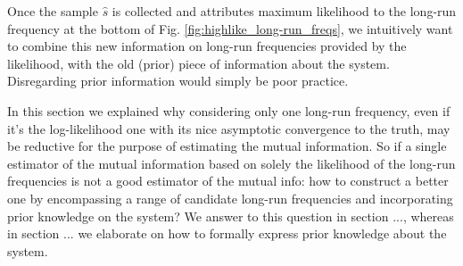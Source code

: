 Once the sample $\hat{s}$ is collected  and attributes maximum likelihood to the long-run frequency at the bottom of Fig. \ref{fig:highlike_long-run_freqs}, we intuitively want to combine this new information on long-run frequencies provided by the likelihood, with the old (prior) piece of information about the system. Disregarding prior information would simply be poor practice.

\vspace{1cm}
In this section we explained why considering only one long-run frequency, even if it's the log-likelihood one with its nice asymptotic convergence to the truth, may be reductive for the purpose of estimating the mutual information.
So if a single estimator of the mutual information based on solely the likelihood of the long-run frequencies is not a good estimator of the mutual info: how to construct a better one by encompassing a range of candidate long-run frequencies and incorporating prior knowledge on the system? We answer to this question in section ..., whereas in section ... we elaborate on how to formally express prior knowledge about the system.

